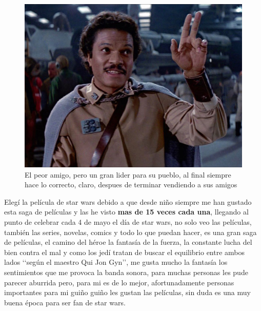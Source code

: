\documentclass[11pt, a5paper]{article}
\begin{document}
\begin{figure}
\includegraphics[scale=0.09, angle=8]{lando_Calrissian.jpg}
\caption*{El peor amigo, pero un gran lider para su pueblo, al final siempre hace lo correcto, claro, despues de terminar vendiendo a sus amigos}

\end{figure}


{\footnotesize{Elegí la película de star wars debido a que desde niño siempre me han gustado esta saga de películas y las he visto {\large\textbf{mas de 15 veces cada una}}, llegando al punto de celebrar cada 4 de mayo el día de star wars, no solo veo las películas, también las series, novelas, comics y todo lo que puedan hacer, es una gran saga de películas, el camino del héroe la fantasía de la fuerza, la constante lucha del bien contra el mal y como los jedí tratan de buscar el equilibrio entre ambos lados ‘‘según el maestro Qui Jon Gyn’’, me gusta mucho la fantasía los sentimientos que me provoca la banda sonora, para muchas personas les pude parecer aburrida pero, para mi es de lo mejor, afortunadamente personas importantes para mi guiño guiño les gustan las películas, sin duda es una muy buena época para ser fan de star wars.}}\\
\end{document}
